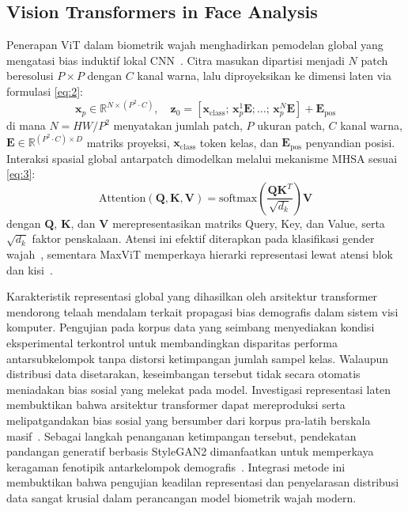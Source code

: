\subsection{Vision Transformers in Face Analysis}
\label{sec:vision_transformers_face}

Penerapan ViT dalam biometrik wajah menghadirkan pemodelan global yang mengatasi bias induktif lokal CNN~\cite{ref14}. Citra masukan dipartisi menjadi $N$ patch beresolusi $P \times P$ dengan $C$ kanal warna, lalu diproyeksikan ke dimensi laten via formulasi \eqref{eq:2}:
\begin{equation}
\mathbf{x}_p \in \mathbb{R}^{N \times (P^2 \cdot C)}, \quad \mathbf{z}_0 = [\mathbf{x}_{\text{class}}; \, \mathbf{x}_p^1\mathbf{E}; \dots; \, \mathbf{x}_p^N\mathbf{E}] + \mathbf{E}_{\text{pos}}
\label{eq:2}
\end{equation}
di mana $N = HW/P^2$ menyatakan jumlah patch, $P$ ukuran patch, $C$ kanal warna, $\mathbf{E} \in \mathbb{R}^{(P^2 \cdot C) \times D}$ matriks proyeksi, $\mathbf{x}_{\text{class}}$ token kelas, dan $\mathbf{E}_{\text{pos}}$ penyandian posisi. Interaksi spasial global antarpatch dimodelkan melalui mekanisme MHSA sesuai \eqref{eq:3}:
\begin{equation}
\text{Attention}(\mathbf{Q}, \mathbf{K}, \mathbf{V}) = \text{softmax}\left(\frac{\mathbf{Q}\mathbf{K}^T}{\sqrt{d_k}}\right)\mathbf{V}
\label{eq:3}
\end{equation}
dengan $\mathbf{Q}$, $\mathbf{K}$, dan $\mathbf{V}$ merepresentasikan matriks Query, Key, dan Value, serta $\sqrt{d_k}$ faktor penskalaan. Atensi ini efektif diterapkan pada klasifikasi gender wajah~\cite{ref17}, sementara MaxViT memperkaya hierarki representasi lewat atensi blok dan kisi~\cite{ref18}.

Karakteristik representasi global yang dihasilkan oleh arsitektur transformer mendorong telaah mendalam terkait propagasi bias demografis dalam sistem visi komputer. Pengujian pada korpus data yang seimbang menyediakan kondisi eksperimental terkontrol untuk membandingkan disparitas performa antarsubkelompok tanpa distorsi ketimpangan jumlah sampel kelas. Walaupun distribusi data disetarakan, keseimbangan tersebut tidak secara otomatis meniadakan bias sosial yang melekat pada model. Investigasi representasi laten membuktikan bahwa arsitektur transformer dapat mereproduksi serta melipatgandakan bias sosial yang bersumber dari korpus pra-latih berskala masif~\cite{ref14}. Sebagai langkah penanganan ketimpangan tersebut, pendekatan pandangan generatif berbasis StyleGAN2 dimanfaatkan untuk memperkaya keragaman fenotipik antarkelompok demografis~\cite{ref15}. Integrasi metode ini membuktikan bahwa pengujian keadilan representasi dan penyelarasan distribusi data sangat krusial dalam perancangan model biometrik wajah modern.


